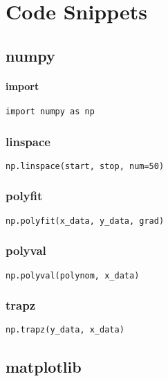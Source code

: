\section{Code Snippets}

\subsection{numpy}

\paragraph{import}

\begin{verbatim}
import numpy as np
\end{verbatim}

\subsubsection{linspace}

\begin{verbatim}
np.linspace(start, stop, num=50)
\end{verbatim}

\subsubsection{polyfit}

\begin{verbatim}
np.polyfit(x_data, y_data, grad)
\end{verbatim}

\subsubsection{polyval}

\begin{verbatim}
np.polyval(polynom, x_data)
\end{verbatim}

\subsubsection{trapz}

\begin{verbatim}
np.trapz(y_data, x_data)
\end{verbatim}

\subsection{matplotlib}


